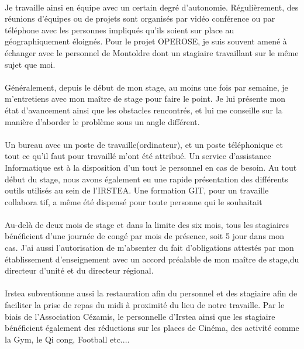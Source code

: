 \paragraph{}
Je travaille ainsi en équipe avec un certain degré d'autonomie. Régulièrement, des réunions d'équipes ou de projets sont organisés par vidéo conférence ou par téléphone avec les personnes impliqués qu'ils soient sur place au géographiquement éloignés. Pour le projet OPEROSE, je suis souvent amené à échanger avec le personnel de Montoldre dont un stagiaire travaillant sur le même sujet que moi.
\paragraph{}
Généralement, depuis le début de mon stage, au moins une fois par semaine, je m'entretiens avec mon maître de stage pour faire le point. Je lui présente mon état d'avancement ainsi que les obstacles rencontrés, et lui me conseille sur la manière d'aborder le problème sous un angle différent.
\paragraph{}
Un bureau avec un poste de travaille(ordinateur), et un poste téléphonique et tout ce qu'il faut pour travaillé m'ont été attribué. Un service d'assistance Informatique est à la disposition d'un tout le personnel en cas de besoin. Au tout début du stage, nous avons également eu une rapide présentation des différents outils utilisés au sein de l'IRSTEA. Une formation GIT, pour un travaille collabora tif, a même été dispensé pour toute personne qui le souhaitait 
\paragraph{}
Au-delà de deux mois de stage et dans la limite des six mois, tous les stagiaires bénéficient d'une journée de congé par mois de présence, soit 5 jour dans mon cas. J'ai aussi l'autorisation de m'absenter du fait d'obligations attestés par mon établissement d'enseignement avec un accord préalable de mon maître de stage,du directeur d'unité et du directeur régional.
\paragraph{}
Irstea subventionne aussi la restauration afin du personnel et des stagiaire afin de faciliter la prise de repas du midi à proximité du lieu de notre travaille. Par le biais de l'Association Cézamis, le personnelle d'Irstea ainsi que les stagiaire bénéficient également des réductions sur les places de Cinéma, des activité comme la Gym, le Qi cong, Football etc....